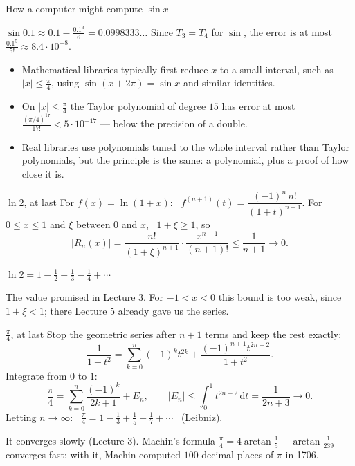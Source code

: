 \documentclass{wosm-slides}
\newcommand{\dt}{\,\mathrm{d}t}
\begin{document}
\begin{frame}{How a computer might compute $\sin x$}
  \begin{example}
    $\sin 0.1 \approx 0.1 - \frac{0.1^3}{6} = 0.0998333\ldots$
    Since $T_3 = T_4$ for $\sin$, the error is at most $\frac{0.1^5}{5!} \approx 8.4 \cdot 10^{-8}$.
  \end{example}
  \pause
  \begin{itemize}
    \item Mathematical libraries typically first reduce $x$ to a small interval, such as
      $|x| \le \frac\pi4$, using $\sin(x + 2\pi) = \sin x$ and similar identities.
    \item On $|x| \le \frac\pi4$ the Taylor polynomial of degree $15$ has error at most
      $\frac{(\pi/4)^{17}}{17!} < 5 \cdot 10^{-17}$ --- below the precision of a double.
    \item Real libraries use polynomials tuned to the whole interval rather than Taylor
      polynomials, but the principle is the same: a polynomial, plus a proof of how close it is.
  \end{itemize}
\end{frame}

\begin{frame}{$\ln 2$, at last}
  For $f(x) = \ln(1 + x)$: \ $f^{(n+1)}(t) = \dfrac{(-1)^n\, n!}{(1 + t)^{n+1}}$.
  \pause
  For $0 \le x \le 1$ and $\xi$ between $0$ and $x$, \ $1 + \xi \ge 1$, so
  \[ |R_n(x)| = \frac{n!}{(1+\xi)^{n+1}} \cdot \frac{x^{n+1}}{(n+1)!} \le \frac{1}{n+1} \to 0 . \]
  \pause
  \begin{theorem}
    $\displaystyle \ln 2 = 1 - \frac12 + \frac13 - \frac14 + \cdots$
  \end{theorem}
  {\small The value promised in Lecture 3. For $-1 < x < 0$ this bound is too weak, since
  $1 + \xi < 1$; there Lecture 5 already gave us the series.\par}
\end{frame}

\begin{frame}{$\frac\pi4$, at last}
  Stop the geometric series after $n + 1$ terms and keep the rest exactly:
  \[ \frac{1}{1 + t^2} = \sum_{k=0}^{n} (-1)^k t^{2k} + \frac{(-1)^{n+1} t^{2n+2}}{1 + t^2} . \]
  \pause
  Integrate from $0$ to $1$:
  \[ \frac{\pi}{4} = \sum_{k=0}^{n} \frac{(-1)^k}{2k+1} + E_n, \qquad
     |E_n| \le \int_0^1 t^{2n+2} \dt = \frac{1}{2n+3} \to 0 . \]
  Letting $n \to \infty$: \ $\displaystyle\frac\pi4 = 1 - \frac13 + \frac15 - \frac17 + \cdots$
  \ (Leibniz).
  {\small It converges slowly (Lecture 3). Machin's formula
  $\frac\pi4 = 4 \arctan\frac15 - \arctan\frac{1}{239}$ converges fast: with it, Machin computed
  $100$ decimal places of $\pi$ in 1706.\par}
\end{frame}
\end{document}
